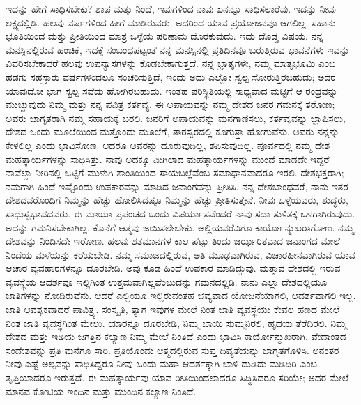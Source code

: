 ಇದನ್ನು ಹೇಗೆ ಸಾಧಿಸಬೇಕು? ಶಾಪ ಮತ್ತು ನಿಂದೆ, ಇವುಗಳಿಂದ ನಾವು ಏನನ್ನೂ ಸಾಧಿಸಲಾರೆವು. ಇದನ್ನು ನೀವು ಲಕ್ಷ್ಯದಲ್ಲಿಡಿ. ಹಲವು ವರ್ಷಗಳಿಂದ ಹೀಗೆ ಮಾಡಿರುವರು. ಅದರಿಂದ ಯಾವ ಪ್ರಯೋಜನವೂ ಆಗಲಿಲ್ಲ. ಸಹಾನು ಭೂತಿಯಿಂದ ಮತ್ತು ಪ್ರೀತಿಯಿಂದ ಮಾತ್ರ ಒಳ್ಳೆಯ ಪರಿಣಾಮ ದೊರಕುವುದು. ಇದು ದೊಡ್ಡ ವಿಷಯ. ನನ್ನ ಮನಸ್ಸಿನಲ್ಲಿರುವ ಹಂಚಿಕೆ, ಇದಕ್ಕೆ ಸಂಬಂಧಪಟ್ಟಂತೆ ನನ್ನ ಮನಸ್ಸಿನಲ್ಲಿ ಪ್ರತಿದಿನವೂ ಬರುತ್ತಿರುವ ಭಾವನೆಗಳು ಇವನ್ನು ವಿವರಿಸಬೇಕಾದರೆ ಹಲವು ಉಪನ್ಯಾಸಗಳನ್ನು ಕೊಡಬೇಕಾಗುತ್ತದೆ. ನನ್ನ ಭ್ರಾತೃಗಳೇ, ನಮ್ಮ ಮಾತೃಭೂಮಿ ಎಂಬ ಹಡಗು ಸಹಸ್ರಾರು ವರ್ಷಗಳಿಂದಲೂ ಸಂಚರಿಸುತ್ತಿದೆ, ಇಂದು ಅದು ಎಲ್ಲೋ ಸ್ವಲ್ಪ ಸೋರುತ್ತಿರಬಹುದು; ಅದರ ಯಾವುದೋ ಭಾಗ ಸ್ವಲ್ಪ ಸವೆದು ಹೋಗಿರಬಹುದು. ಇಂತಹ ಪರಿಸ್ಥಿತಿಯಲ್ಲಿ ಸಾಧ್ಯವಾದ ಮಟ್ಟಿಗೆ ಆ ರಂಧ್ರವನ್ನು ಮುಚ್ಚುವುದು ನಿಮ್ಮ ಮತ್ತು ನನ್ನ ಪವಿತ್ರ ಕರ್ತವ್ಯ. ಈ ಅಪಾಯವನ್ನು ನಮ್ಮ ದೇಶದ ಜನರ ಗಮನಕ್ಕೆ ತರೋಣ; ಅವರು ಜಾಗೃತರಾಗಿ ನಮ್ಮ ಸಹಾಯಕ್ಕೆ ಬರಲಿ. ಜನರಿಗೆ ಅಪಾಯವನ್ನು ಮನಗಾಣಿಸಲು, ಕರ್ತವ್ಯವನ್ನು ಜ್ಞಾಪಿಸಲು, ದೇಶದ ಒಂದು ಮೂಲೆಯಿಂದ ಮತ್ತೊಂದು ಮೂಲೆಗೆ, ತಾರಸ್ವರದಲ್ಲಿ ಕೂಗುತ್ತಾ ಹೋಗುವೆನು. ಅವರು ನನ್ನನ್ನು ಕೇಳಲಿಲ್ಲ ಎಂದು ಭಾವಿಸೋಣ. ಆದರೂ ಅವರನ್ನು ದೂರುವುದಿಲ್ಲ, ಶಪಿಸುವುದಿಲ್ಲ. ಪೂರ್ವದಲ್ಲಿ ನಮ್ಮ ದೇಶ ಮಹತ್ಕಾರ್ಯಗಳನ್ನು ಸಾಧಿಸಿತ್ತು. ನಾವು ಅದಕ್ಕೂ ಮಿಗಿಲಾದ ಮಹತ್ಕಾರ್ಯಗಳನ್ನು ಮುಂದೆ ಮಾಡದೇ ಇದ್ದರೆ ನಾವೆಲ್ಲಾ ನೀರಿನಲ್ಲಿ ಒಟ್ಟಿಗೆ ಮುಳುಗಿ ಶಾಂತಿಯಿಂದ ಸಾಯಬಲ್ಲೆವೆಂಬ ಸಮಾಧಾನವಾದರೂ ಇರಲಿ. ದೇಶಭಕ್ತರಾಗಿ; ನಮಗಾಗಿ ಹಿಂದೆ ಇಷ್ಟೊಂದು ಉಪಕಾರವನ್ನು ಮಾಡಿದ ಜನಾಂಗವನ್ನು ಪ್ರೀತಿಸಿ. ನನ್ನ ದೇಶಬಾಂಧವರೆ, ನಾನು ಇತರ ದೇಶದವರೊಂದಿಗೆ ನಿಮ್ಮನ್ನು ಹೆಚ್ಚು ಹೋಲಿಸಿದಷ್ಟೂ ನಿಮ್ಮನ್ನು ಹೆಚ್ಚು ಪ್ರೀತಿಸುತ್ತೇನೆ. ನೀವು ಒಳ್ಳೆಯವರು, ಶುದ್ಧರು, ಸಾಧುಸ್ವಭಾವದವರು. ಈ ಮಾಯಾ ಪ್ರಪಂಚದ ಒಂದು ವಿಪರ್ಯಾಸವೆಂದರೆ ನಾವು ಸದಾ ತುಳಿತಕ್ಕೆ ಒಳಗಾಗಿರುವುದು. ಅದನ್ನು ಗಮನಿಸಬೇಕಾಗಿಲ್ಲ. ಕೊನೆಗೆ ಆತ್ಮವು ಜಯಿಸಲೇಬೇಕು. ಅಲ್ಲಿಯವರೆವಿಗೂ ಕಾರ್ಯೋನ್ಮುಖರಾಗೋಣ. ನಮ್ಮ ದೇಶವನ್ನು ನಿಂದಿಸದೇ ಇರೋಣ. ಹಲವು ಶತಮಾನಗಳ ಕಾಲ ಪೆಟ್ಟು ತಿಂದು ಜರ್ಝರಿತವಾದ ಜನಾಂಗದ ಮೇಲೆ ನಿಂದೆಯ ಮಳೆಯನ್ನು ಕರೆಯಬೇಡಿ. ನಮ್ಮ ಸಮಾಜದಲ್ಲಿರುವ, ಅತಿ ಮೂಢವಾಗಿರುವ, ವಿಚಾರಹೀನವಾಗಿರುವ ಯಾವ ಆಚಾರ ವ್ಯವಹಾರಗಳನ್ನೂ ದೂರಬೇಡಿ. ಅವು ಕೂಡ ಹಿಂದೆ ಉಪಕಾರ ಮಾಡಿದ್ದುವು. ಮತ್ತಾವ ದೇಶದಲ್ಲಿ ಇರುವ ವ್ಯವಸ್ಥೆಯ ಆದರ್ಶವೂ ಇಲ್ಲಿಗಿಂತ ಉತ್ತಮವಾಗಿಲ್ಲವೆಂಬುದನ್ನು ಗಮನದಲ್ಲಿಡಿ. ನಾನು ಎಲ್ಲಾ ದೇಶದಲ್ಲಿಯೂ ಜಾತಿಗಳನ್ನು ನೋಡಿರುವೆನು. ಆದರೆ ಎಲ್ಲಿಯೂ ಇಲ್ಲಿರುವಂತಹ ಭವ್ಯವಾದ ಯೋಜನೆಯಾಗಲಿ, ಆದರ್ಶವಾಗಲಿ ಇಲ್ಲ. ಜಾತಿ ಆವಶ್ಯಕವಾದರೆ ಪಾವಿತ್ರ್ಯ. ಸಂಸ್ಕೃತಿ, ತ್ಯಾಗ ಇವುಗಳ ಮೇಲೆ ನಿಂತ ಜಾತಿ ವ್ಯವಸ್ಥೆಯು ಕೇವಲ ಹಣದ ಮೇಲೆ ನಿಂತ ಜಾತಿ ವ್ಯವಸ್ಥೆಗಿಂತ ಮೇಲು. ಯಾರನ್ನೂ ದೂರಬೇಡಿ, ನಿಮ್ಮ ಬಾಯಿ ಸುಮ್ಮನಿರಲಿ, ಹೃದಯ ತೆರೆದಿರಲಿ. ನಿಮ್ಮ ದೇಶದ ಮತ್ತು ಇಡಿಯ ಜಗತ್ತಿನ ಕಲ್ಯಾಣ ನಿಮ್ಮ ಮೇಲೆ ನಿಂತಿದೆ ಎಂದು ಭಾವಿಸಿ ಕಾರ್ಯೋನ್ಮುಖರಾಗಿ. ವೇದಾಂತದ ಸಂದೇಶವನ್ನು ಪ್ರತಿ ಮನೆಗೂ ಸಾರಿ. ಪ್ರತಿಯೊಂದು ಆತ್ಮದಲ್ಲಿರುವ ಸುಪ್ತ ದಿವ್ಯತೆಯನ್ನು ಜಾಗೃತಗೊಳಿಸಿ. ಅನಂತರ ನೀವು ಎಷ್ಟೆ ಅಲ್ಪವನ್ನು ಸಾಧಿಸಿದ್ದರೂ ನೀವು ಒಂದು ಮಹಾ ಆದರ್ಶಕ್ಕಾಗಿ ಬಾಳಿ ದುಡಿದು ಮಡಿದಿರಿ ಎಂಬ ತೃಪ್ತಿಯಾದರೂ ಇರುತ್ತದೆ. ಈ ಮಹತ್ಕಾರ್ಯವು ಯಾವ ರೀತಿಯಿಂದಲಾದರೂ ಸಿದ್ಧಿಸಿದರೂ ಸರಿಯೇ; ಅದರ ಮೇಲೆ ಮಾನವ ಕೋಟಿಯ ಇಂದಿನ ಮತ್ತು ಮುಂದಿನ ಕಲ್ಯಾಣ ನಿಂತಿದೆ. 

